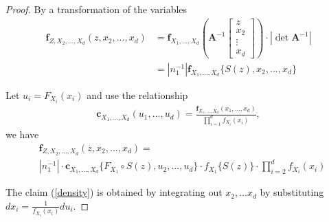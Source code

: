 \begin{proof}
   By a transformation of the variables 
   \begin{align}
      \bm{f}_{Z,X_2,...,X_d}(z, x_2, ...,x_d) &= \bm{f}_{X_1,...,X_d}\left( \bm{A}^{-1}
      \begin{bmatrix}
         z \\ x_2 \\ \vdots \\ x_d
      \end{bmatrix}
      \right)  \cdot |\det \bm{A}^{-1}| \\
      &= \left| n_1^{-1} \right| \bm{f}_{X_1,...,X_d}\{S(z), x_2,...,x_d\}
      \end{align} \medskip

   Let $u_i = F_{X_i}(x_i)$ and  use the relationship 
   \begin{align}
      \bm{c}_{X_1,...,X_d}(u_1, ..., u_d)=\frac{\bm{f}_{X_1,...,X_d}(x_1,...,x_d)}{\prod_{i=1}^d f_{X_i}(x_i)},
   \end{align}
   we have
   \begin{align}
     & \bm{f}_{Z,X_2,...,X_d}(z, x_2, ...,x_d) = \\
      & \left| n_1^{-1} \right| \cdot
      \bm{c}_{X_1,...,X_d}\{F_{X_1} \circ S(z), u_2, ...,  u_d\}  \cdot
      f_{X_1} \{ S(z) \} \cdot
      \prod_{i=2}^d f_{X_i}(x_i)
      \end{align}

   The claim (\ref{density}) is obtained by integrating out $x_2, ... x_d$ by substituting $dx_i = \frac{1}{f_{X_i}(x_i)}du_i$.
   \end{proof}

\clearpage



%


%




